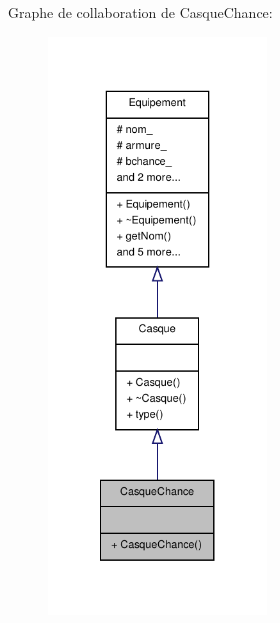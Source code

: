 Graphe de collaboration de Casque\-Chance\-:
\nopagebreak
\begin{figure}[H]
\begin{center}
\leavevmode
\includegraphics[width=164pt]{class_casque_chance__coll__graph}
\end{center}
\end{figure}
